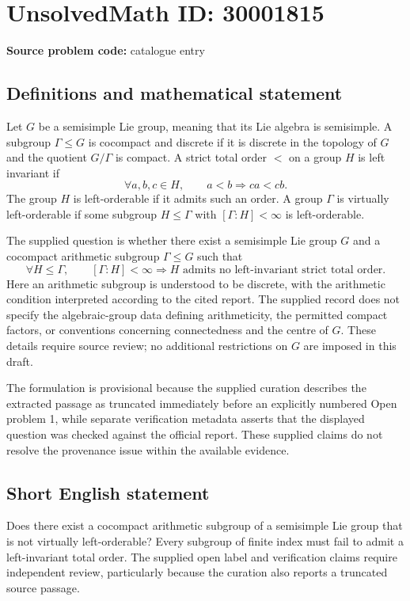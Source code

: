 \documentclass[11pt]{article}
\begin{document}
\section*{UnsolvedMath ID: 30001815}
\textbf{Source problem code:} catalogue entry
\subsection{Definitions and mathematical statement}
Let \(G\) be a semisimple Lie group, meaning that its Lie algebra is semisimple. A subgroup \(\Gamma\leq G\) is cocompact and discrete if it is discrete in the topology of \(G\) and the quotient \(G/\Gamma\) is compact. A strict total order \(<\) on a group \(H\) is left invariant if
\[
\forall a,b,c\in H,\qquad a<b\Longrightarrow ca<cb.
\]
The group \(H\) is left-orderable if it admits such an order. A group \(\Gamma\) is virtually left-orderable if some subgroup \(H\leq\Gamma\) with \([\Gamma:H]<\infty\) is left-orderable.

The supplied question is whether there exist a semisimple Lie group \(G\) and a cocompact arithmetic subgroup \(\Gamma\leq G\) such that
\[
\forall H\leq\Gamma,\qquad
[\Gamma:H]<\infty\Longrightarrow
H\text{ admits no left-invariant strict total order}.
\]
Here an arithmetic subgroup is understood to be discrete, with the arithmetic condition interpreted according to the cited report. The supplied record does not specify the algebraic-group data defining arithmeticity, the permitted compact factors, or conventions concerning connectedness and the centre of \(G\). These details require source review; no additional restrictions on \(G\) are imposed in this draft.

The formulation is provisional because the supplied curation describes the extracted passage as truncated immediately before an explicitly numbered Open problem 1, while separate verification metadata asserts that the displayed question was checked against the official report. These supplied claims do not resolve the provenance issue within the available evidence.
\subsection{Short English statement}
Does there exist a cocompact arithmetic subgroup of a semisimple Lie group that is not virtually left-orderable? Every subgroup of finite index must fail to admit a left-invariant total order. The supplied open label and verification claims require independent review, particularly because the curation also reports a truncated source passage.
\end{document}
